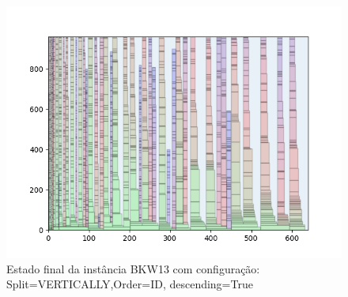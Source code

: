 \begin{figure}[H]
    \centering
    \caption[]{Estado final da instância BKW13 com configuração: Split=VERTICALLY,Order=ID, descending=True}
    \label{fig:bkw13-vertically-id-true}
    \includegraphics[scale=0.5]{output/figures/bkw/bkw13/vertically/id/true/0000}
\end{figure}